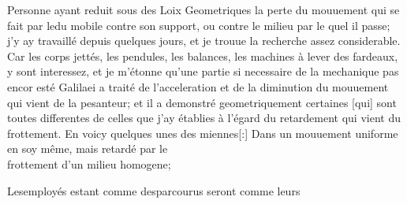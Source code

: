 \vspace*{8mm}
\pstart 
\normalsize
\noindent
[142~r\textsuperscript{o}] Personne ayant reduit sous des Loix Geometriques la perte du mouuement qui se fait par ledu mobile contre son support, ou contre le milieu par le quel il passe; j'y ay travaill\'{e} depuis quelques jours, et je trouue la recherche assez considerable.
\pend
\count{}
\count{}
\count{}
\pstart
Car les corps jett\'{e}s, les pendules, les balances,  les machines \`{a} lever des fardeaux,  y sont interessez, et je m'\'{e}tonne qu'une partie si necessaire de la mechanique  pas encor est\'{e} 
\pend
\pstart
Galilaei\protect{} a trait\'{e} de l'acceleration et de la diminution du mouuement qui vient de la pesanteur; et il a demonstr\'{e} geometriquement certaines  [qui] sont toutes differentes de celles que j'ay \'{e}tablies \`{a} l'\'{e}gard du retardement qui vient du frottement. En voicy quelques unes des miennes[:]
\pend
\pstart
Dans un mouuement uniforme en soy m\^{e}me, mais retard\'{e}  par le\\
\hspace*{7,5mm}frottement d'un milieu homogene;
\pend
\newpage
\begin{Geometrico}
Lesemploy\'{e}s estant comme desparcourus seront comme leurs
\end{Geometrico}
